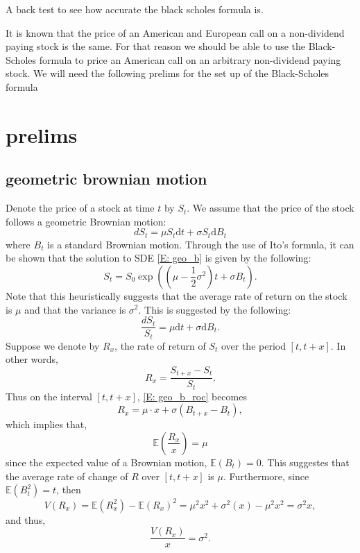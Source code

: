 \documentclass{article}
\numberwithin{equation}{section}
\newcommand{\ud}{\ensuremath{\mathrm{d}}}
\begin{document}
\begin{center}
	A back test to see how accurate the black scholes formula is.
\end{center}

It is known that the price of an American and European call on a non-dividend paying stock is the same. For that reason we should be able to use the Black-Scholes formula to price an American call on an arbitrary non-dividend paying stock. We will need the following prelims for the set up of the Black-Scholes formula 

\section{prelims}
\subsection{geometric brownian motion}
Denote the  price of a stock at time $t$ by $S_t$. We assume that the price of the stock follows a geometric Brownian motion:
	\begin{equation} \label{E: geo_b}
		dS_t = \mu S_t \ud t + \sigma S_t \ud B_t
	\end{equation}
where $B_t$ is a standard Brownian motion. Through the use of Ito's formula, it can be shown that the solution to SDE \eqref{E: geo_b} is given by the following:
	\begin{equation} \label{E: geo_b_sol}
		S_t = S_0 \exp\left( \left( \mu - \frac{1}{2}\sigma^2 \right)t + \sigma B_t \right).
	\end{equation} 
Note that this heuristically suggests that the average rate of return on the stock is $\mu$ and that the variance is $\sigma^2$. This is suggested by the following:
	\begin{equation} \label{E: geo_b_roc}
		\frac{dS_t}{S_t} = \mu \ud t + \sigma \ud B_t.
	\end{equation}
Suppose we denote by $R_x$, the rate of return of $S_t$ over the period $[t, t+x]$. In other words,
	\[
		R_x = \frac{S_{t+x} - S_t}{S_t}.
	\]
Thus on the interval $[t, t+x]$, \eqref{E: geo_b_roc} becomes 
	\begin{equation}
		R_x = \mu \cdot x + \sigma (B_{t + x} - B_t),
	\end{equation}
which implies that,
	\begin{equation}
		\mathbb{E}\left(\frac{R_x}{x}\right) = \mu
	\end{equation}
since the expected value of a Brownian motion, $\mathbb{E}(B_t) = 0$. This suggestes that the average rate of change of $R$ over $[t, t + x]$ is $\mu$. Furthermore, since $\mathbb{E}(B_t^2) = t$, then 
	\[
		V(R_x) = \mathbb{E}(R_x^2) - \mathbb{E}(R_x)^2 = \mu^2 x^2 + \sigma^2 (x) - \mu^2 x^2 = \sigma^2 x,
	\]
and thus,
	\[
		\frac{	V(R_x) }{x} = \sigma^2.
	\]
\end{document}
